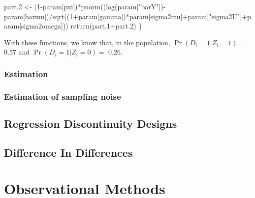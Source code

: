 \documentclass[
]{book}
\newenvironment{Shaded}{\begin{snugshade}}{\end{snugshade}}
\newcommand{\DecValTok}[1]{\textcolor[rgb]{0.00,0.00,0.81}{#1}}
\newcommand{\FloatTok}[1]{\textcolor[rgb]{0.00,0.00,0.81}{#1}}
\newcommand{\FunctionTok}[1]{\textcolor[rgb]{0.00,0.00,0.00}{#1}}
\newcommand{\NormalTok}[1]{#1}
\newcommand{\OtherTok}[1]{\textcolor[rgb]{0.56,0.35,0.01}{#1}}
\newcommand{\SpecialCharTok}[1]{\textcolor[rgb]{0.00,0.00,0.00}{#1}}
\newcommand{\StringTok}[1]{\textcolor[rgb]{0.31,0.60,0.02}{#1}}
\theoremstyle{definition}
\theoremstyle{definition}
\theoremstyle{definition}
\theoremstyle{definition}
\theoremstyle{remark}
\begin{document}
\begin{Shaded}
\begin{Highlighting}[]
\NormalTok{  part}\FloatTok{.2} \OtherTok{\textless{}{-}}\NormalTok{ (}\DecValTok{1}\SpecialCharTok{{-}}\NormalTok{param[}\StringTok{\textquotesingle{}pxi\textquotesingle{}}\NormalTok{])}\SpecialCharTok{*}\FunctionTok{pnorm}\NormalTok{((}\FunctionTok{log}\NormalTok{(param[}\StringTok{"barY"}\NormalTok{])}\SpecialCharTok{{-}}\NormalTok{param[}\StringTok{\textquotesingle{}barmu\textquotesingle{}}\NormalTok{])}\SpecialCharTok{/}\FunctionTok{sqrt}\NormalTok{((}\DecValTok{1}\SpecialCharTok{+}\NormalTok{param[}\StringTok{\textquotesingle{}gamma\textquotesingle{}}\NormalTok{])}\SpecialCharTok{*}\NormalTok{param[}\StringTok{\textquotesingle{}sigma2mu\textquotesingle{}}\NormalTok{]}\SpecialCharTok{+}\NormalTok{param[}\StringTok{"sigma2U"}\NormalTok{]}\SpecialCharTok{+}\NormalTok{param[}\StringTok{\textquotesingle{}sigma2omega\textquotesingle{}}\NormalTok{]))}
  \FunctionTok{return}\NormalTok{(part}\FloatTok{.1}\SpecialCharTok{+}\NormalTok{part}\FloatTok{.2}\NormalTok{)}
\NormalTok{\}}
\end{Highlighting}
\end{Shaded}

With these functions, we know that, in the population, \(\Pr(D_i=1|Z_i=1)=\) 0.57 and \(\Pr(D_i=1|Z_i=0)=\) 0.26.

\hypertarget{estimation}{%
\subsection{Estimation}\label{estimation}}

\hypertarget{estimation-of-sampling-noise}{%
\subsection{Estimation of sampling noise}\label{estimation-of-sampling-noise}}

\hypertarget{regression-discontinuity-designs}{%
\section{Regression Discontinuity Designs}\label{regression-discontinuity-designs}}

\hypertarget{difference-in-differences}{%
\section{Difference In Differences}\label{difference-in-differences}}

\hypertarget{sec:OM}{%
\chapter{Observational Methods}\label{sec:OM}}
\end{document}
